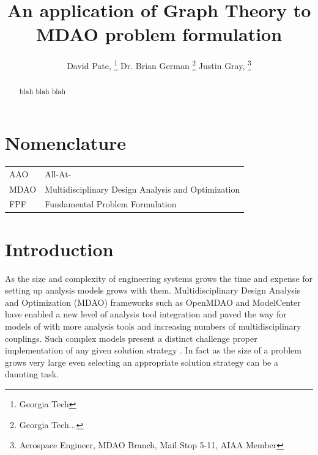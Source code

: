 \documentclass[]{aiaa-tc} %
\title{An application of Graph Theory to MDAO problem formulation}
\author{
  David Pate, %
     \thanks{Georgia Tech}
  Dr. Brian German 
     \thanks{Georgia Tech...}
  Justin Gray,%
     \thanks{Aerospace Engineer, MDAO Branch, Mail Stop 5-11, AIAA Member}   
 }
\begin{document}
\maketitle
 
\begin{abstract}
   blah blah blah
\end{abstract}

\section*{Nomenclature}

\begin{tabular}{l l} 
    AAO      & All-At- \\
    MDAO     & Multidisciplinary Design Analysis and Optimization \\
    FPF      & Fundamental Problem Formulation \\
\end{tabular}


\section{Introduction}
    
    As the size and complexity of engineering systems grows the time and expense for setting up 
    analysis models grows with them. Multidisciplinary Design Analysis and Optimization (MDAO)
    frameworks such as OpenMDAO\cite{Gray2012} and ModelCenter have enabled a new level of analysis tool integration 
    and paved the way for models of with more analysis tools and increasing numbers of multidisciplinary couplings. 
    Such complex models present a distinct challenge proper implementation of any given solution strategy . 
    In fact as the size of a problem grows very large even selecting an appropriate solution strategy can be a daunting 
    task. 
\end{document}
